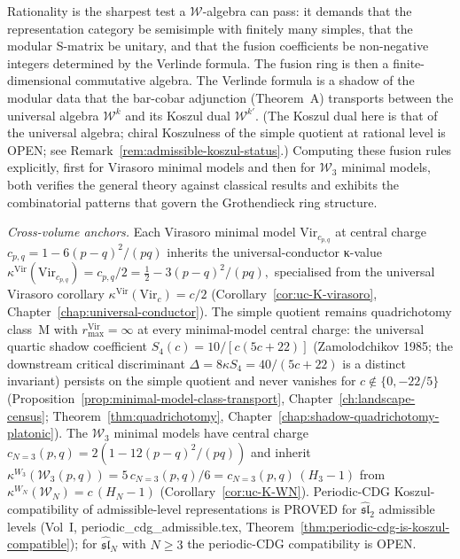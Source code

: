 \providecommand{\BRST}{\mathrm{BRST}}
\providecommand{\BRSTGauged}{\mathrm{BRSTGaugedChirAlg}}

Rationality is the sharpest test a $\mathcal{W}$-algebra can pass:
it demands that the representation category be semisimple with
finitely many simples, that the modular S-matrix be unitary, and
that the fusion coefficients be non-negative integers determined by
the Verlinde formula. The fusion ring is then a finite-dimensional
commutative algebra.
The Verlinde formula is a shadow of the modular data that the
bar-cobar adjunction (Theorem~A) transports between the
universal algebra $\mathcal{W}^k$ and its Koszul dual
$\mathcal{W}^{k'}$. (The Koszul dual here is that of the
universal algebra; chiral Koszulness of the simple quotient
at rational level is OPEN; see Remark~\ref{rem:admissible-koszul-status}.) Computing these fusion
rules explicitly, first for Virasoro minimal models and then for
$\mathcal{W}_3$ minimal models, both verifies the general theory
against classical results and exhibits the combinatorial patterns
that govern the Grothendieck ring structure.

\medskip
\noindent\emph{Cross-volume anchors.}
Each Virasoro minimal model $\mathrm{Vir}_{c_{p,q}}$ at central charge
$c_{p,q} = 1 - 6(p-q)^2/(pq)$ inherits the universal-conductor κ-value
\(
 \kappa^{\mathrm{Vir}}(\mathrm{Vir}_{c_{p,q}})
 = c_{p,q}/2
 = \tfrac{1}{2} - 3(p-q)^2/(pq),
\)
specialised from the universal Virasoro corollary
$\kappa^{\mathrm{Vir}}(\mathrm{Vir}_c) = c/2$
(Corollary~\ref{cor:uc-K-virasoro},
Chapter~\ref{chap:universal-conductor}). The simple quotient remains
quadrichotomy class~M with $r_{\max}^{\mathrm{Vir}} = \infty$ at
every minimal-model central charge: the universal quartic shadow
coefficient $S_4(c) = 10/[c(5c+22)]$ (Zamolodchikov 1985; the
downstream critical discriminant $\Delta = 8\kappa S_4 = 40/(5c+22)$
is a distinct invariant) persists on the simple
quotient and never vanishes for $c \notin \{0, -22/5\}$
(Proposition~\ref{prop:minimal-model-class-transport},
Chapter~\ref{ch:landscape-census}; Theorem~\ref{thm:quadrichotomy},
Chapter~\ref{chap:shadow-quadrichotomy-platonic}). The
$\mathcal{W}_3$ minimal models have central charge
$c_{N=3}(p,q) = 2(1 - 12(p-q)^2/(pq))$ and inherit
$\kappa^{W_3}(\mathcal{W}_3(p,q)) = 5\,c_{N=3}(p,q)/6 = c_{N=3}(p,q)\,(H_3 - 1)$
from $\kappa^{W_N}(\mathcal{W}_N) = c\,(H_N - 1)$
(Corollary~\ref{cor:uc-K-WN}).
Periodic-CDG Koszul-compatibility of admissible-level
representations is PROVED for $\widehat{\mathfrak{sl}}_2$ admissible
levels (Vol~I, periodic\_cdg\_admissible.tex,
Theorem~\ref{thm:periodic-cdg-is-koszul-compatible}); for
$\widehat{\mathfrak{sl}}_N$ with $N \geq 3$ the periodic-CDG
compatibility is OPEN.
\medskip

